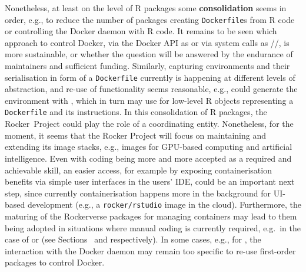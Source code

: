 Nonetheless, at least on the level of R packages some
\textbf{consolidation} seems in order, e.g., to reduce the number of
packages creating \texttt{Dockerfile}s from R code or controlling the
Docker daemon with R code. It remains to be seen which approach to
control Docker, via the Docker API as  or via system
calls as //, is more sustainable,
or whether the question will be answered by the endurance of maintainers
and sufficient funding. Similarly, capturing environments and their
serialisation in form of a \texttt{Dockerfile} currently is happening at
different levels of abstraction, and re-use of functionality seems
reasonable, e.g.,  could generate the environment with
, which in turn may use  for low-level
R objects representing a \texttt{Dockerfile} and its instructions. In
this consolidation of R packages, the Rocker~Project could play the role
of a coordinating entity. Nonetheless, for the moment, it seems that the
Rocker Project will focus on maintaining and extending its image stacks,
e.g., images for GPU-based computing and artificial intelligence. Even
with coding being more and more accepted as a required and achievable
skill, an easier access, for example by exposing containerisation
benefits via simple user interfaces in the users' IDE, could be an
important next step, since currently containerisation happens more in
the background for UI-based development (e.g., a \texttt{rocker/rstudio}
image in the cloud). Furthermore, the maturing of the Rockerverse
packages for managing containers may lead to them being adopted in
situations where manual coding is currently required, e.g.~in the case
of  or  (see
Sections~ and  respectively). In some
cases, e.g., for , the interaction with the Docker
daemon may remain too specific to re-use first-order packages to control
Docker.

